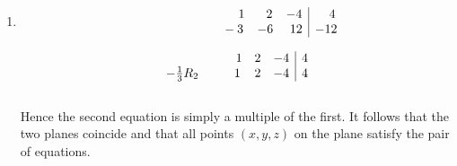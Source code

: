 \documentclass[12pt]{amsart}
\begin{document}
\begin{enumerate}
		\begin{enumerate}
		
			\item
			\begin{align}
				\begin{array}{ccc|c}
					\text{ }\hspace{2.8cm}1&\text{ } \text{ }2&-4& \text{ } \text{ } \text{ }4 \\
					\text{ }\hspace{2.3cm}-3&-6& \text{ }12&-12
				\end{array} \notag
			\end{align} 
			
			\begin{align}
				\begin{array}{ccc|c}
					\text{ }\hspace{1.9cm}1&2&-4&4 \\ 
					-\frac{1}{3}R_2 \hspace{1cm} 1&2&-4&4
				\end{array} \notag
			\end{align} \\
			Hence the second equation is simply a multiple of the first.  It follows that the two planes 					coincide and that all points $(x,y,z)$ on the plane satisfy the pair of equations. \\
			

\end{enumerate}
\end{enumerate}
\end{document}
